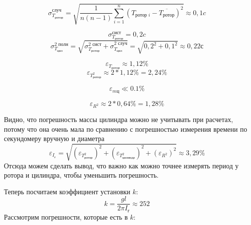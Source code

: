 \documentclass[a4paper,12pt]{article}
\begin{document}
	\begin{equation}
		\sigma_{T_{\text{ротор}}}^\text{случ}=\sqrt{\frac{1}{n(n-1)} \sum_{i=1}^{n}(T_{\text{ротор }i} - \overline{T_{\text{ротор}}})^2}\approx 0,1 c 
	\end{equation}
	
	
	\begin{equation}
		\sigma_{T_{\text{ротор}}}^\text{сист}=0,2 c
	\end{equation}
	\begin{equation}
		\sigma_{T_{\text{цил}}}^\text{2 полн}=\sqrt{\sigma_{T_{\text{ротор}}}^\text{2 сист} + \sigma_{T_{\text{цил}}}^\text{2 случ}} = \sqrt{0,2^2 + 0,1^2}\approx 0,22 с
	\end{equation}
	
	\begin{equation}
		\varepsilon_{T_{\text{ротор}}}\approx 1,12\%
	\end{equation}
	\begin{equation}
		\varepsilon_{T_{\text{ротор}}^2}\approx 2*1,12\%=2,24\%
	\end{equation}
	
	\begin{equation}
		\varepsilon_{m\text{ц}}\ll 0.1\%
	\end{equation}
	
	\begin{equation}
		\varepsilon_{R^2}\approx 2*0,64\%=1,28\%
	\end{equation}
	
	
	Видно, что погрешность массы цилиндра можно не учитывать при расчетах, потому что она очень мала по сравнению с погрешностью измерения времени по секундомеру вручную и диаметра
	\begin{equation}
		\varepsilon_{I_\text{г}}= \sqrt{(\varepsilon_{T_{\text{ротор}}^2})^2 + (\varepsilon_{T_{\text{цилиндр}}^2})^2+ (\varepsilon_{R^2})^2} \approx 3,29\%
	\end{equation}
	Отсюда можем сделать вывод, что важно как можно точнее измерять период у ротора и цилиндра, чтобы уменьшить погрешность.
	
	Теперь посчитаем коэффициент установки $k$:
	\begin{equation}
		k=\frac{gl}{2\pi I_\text{г}}\approx 252 
	\end{equation}
	Рассмотрим погрешности, которые есть в $k$:
	
\end{document}
